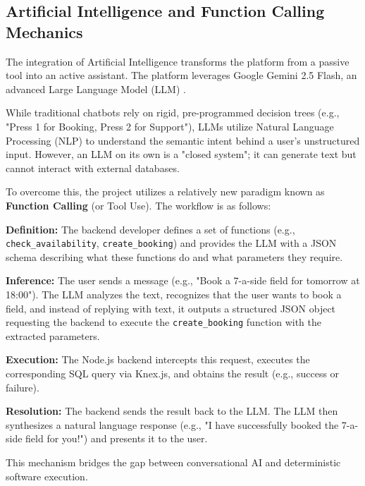 \subsection{Artificial Intelligence and Function Calling Mechanics}
The integration of Artificial Intelligence transforms the platform from a passive tool into an active assistant. The platform leverages Google Gemini 2.5 Flash, an advanced Large Language Model (LLM) \cite{gemini_api}. 

While traditional chatbots rely on rigid, pre-programmed decision trees (e.g., "Press 1 for Booking, Press 2 for Support"), LLMs utilize Natural Language Processing (NLP) to understand the semantic intent behind a user's unstructured input. However, an LLM on its own is a "closed system"; it can generate text but cannot interact with external databases.

To overcome this, the project utilizes a relatively new paradigm known as \textbf{Function Calling} (or Tool Use). The workflow is as follows:
\begin{enumerate}
    \begin{sloppypar}
    \item \textbf{Definition:} The backend developer defines a set of functions (e.g., \texttt{check\_availability}, \texttt{create\_booking}) and provides the LLM with a JSON schema describing what these functions do and what parameters they require.
    \end{sloppypar}
    \item \textbf{Inference:} The user sends a message (e.g., "Book a 7-a-side field for tomorrow at 18:00"). The LLM analyzes the text, recognizes that the user wants to book a field, and instead of replying with text, it outputs a structured JSON object requesting the backend to execute the \texttt{create\_booking} function with the extracted parameters.
    \item \textbf{Execution:} The Node.js backend intercepts this request, executes the corresponding SQL query via Knex.js, and obtains the result (e.g., success or failure).
    \item \textbf{Resolution:} The backend sends the result back to the LLM. The LLM then synthesizes a natural language response (e.g., "I have successfully booked the 7-a-side field for you!") and presents it to the user.
\end{enumerate}
This mechanism bridges the gap between conversational AI and deterministic software execution.

